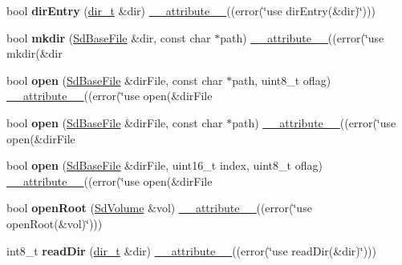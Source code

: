 \begin{DoxyCompactItemize}
\item 
\hypertarget{class_sd_base_file_ad7a4eda4563ff1e5a6251e36db92a53d}{bool {\bfseries dir\-Entry} (\hyperlink{_sd_fat_structs_8h_a803db59d4e16a0c54a647afc6a7954e3}{dir\-\_\-t} \&dir) \hyperlink{group__digital_pin_ga5589cd85aa7f8bf2b29ba1541eeb7103}{\-\_\-\-\_\-attribute\-\_\-\-\_\-}((error(\char`\"{}use dir\-Entry(\&dir)\char`\"{})))}\label{class_sd_base_file_ad7a4eda4563ff1e5a6251e36db92a53d}

\item 
\hypertarget{class_sd_base_file_a6b604b073052842aa4c479cb9ccd8be4}{bool {\bfseries mkdir} (\hyperlink{class_sd_base_file}{Sd\-Base\-File} \&dir, const char $\ast$path) \hyperlink{group__digital_pin_ga5589cd85aa7f8bf2b29ba1541eeb7103}{\-\_\-\-\_\-attribute\-\_\-\-\_\-}((error(\char`\"{}use mkdir(\&dir}\label{class_sd_base_file_a6b604b073052842aa4c479cb9ccd8be4}

\item 
\hypertarget{class_sd_base_file_a5d1c617ddf4e6019613e79af477d5c6f}{bool {\bfseries open} (\hyperlink{class_sd_base_file}{Sd\-Base\-File} \&dir\-File, const char $\ast$path, uint8\-\_\-t oflag) \hyperlink{group__digital_pin_ga5589cd85aa7f8bf2b29ba1541eeb7103}{\-\_\-\-\_\-attribute\-\_\-\-\_\-}((error(\char`\"{}use open(\&dir\-File}\label{class_sd_base_file_a5d1c617ddf4e6019613e79af477d5c6f}

\item 
\hypertarget{class_sd_base_file_adb73974c3511171cb2e0f30792745b18}{bool {\bfseries open} (\hyperlink{class_sd_base_file}{Sd\-Base\-File} \&dir\-File, const char $\ast$path) \hyperlink{group__digital_pin_ga5589cd85aa7f8bf2b29ba1541eeb7103}{\-\_\-\-\_\-attribute\-\_\-\-\_\-}((error(\char`\"{}use open(\&dir\-File}\label{class_sd_base_file_adb73974c3511171cb2e0f30792745b18}

\item 
\hypertarget{class_sd_base_file_a62bf8ae3d7b7c0c43bcce0a0f1d5b464}{bool {\bfseries open} (\hyperlink{class_sd_base_file}{Sd\-Base\-File} \&dir\-File, uint16\-\_\-t index, uint8\-\_\-t oflag) \hyperlink{group__digital_pin_ga5589cd85aa7f8bf2b29ba1541eeb7103}{\-\_\-\-\_\-attribute\-\_\-\-\_\-}((error(\char`\"{}use open(\&dir\-File}\label{class_sd_base_file_a62bf8ae3d7b7c0c43bcce0a0f1d5b464}

\item 
\hypertarget{class_sd_base_file_a8543f213a9b5402564d4ea85a3463616}{bool {\bfseries open\-Root} (\hyperlink{class_sd_volume}{Sd\-Volume} \&vol) \hyperlink{group__digital_pin_ga5589cd85aa7f8bf2b29ba1541eeb7103}{\-\_\-\-\_\-attribute\-\_\-\-\_\-}((error(\char`\"{}use open\-Root(\&vol)\char`\"{})))}\label{class_sd_base_file_a8543f213a9b5402564d4ea85a3463616}

\item 
\hypertarget{class_sd_base_file_ac688af3bef42702b4d6513ff586ba802}{int8\-\_\-t {\bfseries read\-Dir} (\hyperlink{_sd_fat_structs_8h_a803db59d4e16a0c54a647afc6a7954e3}{dir\-\_\-t} \&dir) \hyperlink{group__digital_pin_ga5589cd85aa7f8bf2b29ba1541eeb7103}{\-\_\-\-\_\-attribute\-\_\-\-\_\-}((error(\char`\"{}use read\-Dir(\&dir)\char`\"{})))}\label{class_sd_base_file_ac688af3bef42702b4d6513ff586ba802}

\end{DoxyCompactItemize}
